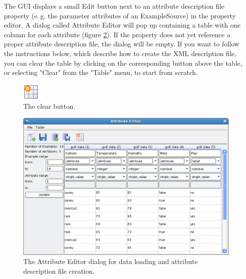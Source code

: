 \documentclass[11pt]{article}
\newcommand{\useroption}[1]{\textsf{#1}}
\newcommand{\operator}[1]{\textsf{#1}}
\newcommand{\parameter}[1]{\textsf{#1}}
\begin{document}
The GUI displays a small \useroption{Edit} button next to an attribute
description file property (e.\,g. the parameter \parameter{attributes} of an
\operator{ExampleSource}) in the property editor. A dialog called
Attribute Editor will pop up containing a table with one column for
each attribute (figure \ref{fig:attribute_editor}). If the property
does not yet reference a proper attribute description file, the dialog
will be empty. If you want to follow the instructions below, which describe 
how to create the XML description file, you can clear the table by clicking on
the corresponding button above the table, or selecting "Clear" from the "Table" menu, 
to start from scratch.
\begin{figure}[ht]
\center
\includegraphics[width=0.08\linewidth]{clear_button.png}
\caption{The clear button.}
\label{fig:attribute_editor}
\end{figure}

\begin{figure}[ht]
\center
\includegraphics[width=0.88\linewidth]{attribute_editor.png}
\caption{The Attribute Editor dialog for data loading and attribute
  description file creation.}
\label{fig:attribute_editor}
\end{figure}
\end{document}
